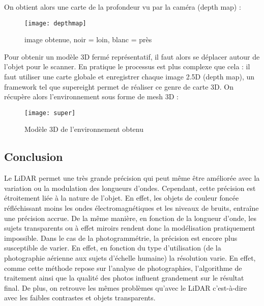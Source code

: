 On obtient alors une carte de la profondeur vu par la caméra (depth map) :

\begin{figure}[h]
    \centering
    \texttt{[image: depthmap]}
    \caption{image obtenue, noir = loin, blanc = près}
    \label{fig:pifuhdWork3}
\end{figure}
\FloatBarrier

Pour obtenir un modèle 3D fermé représentatif, il faut alors se déplacer autour de l'objet pour le scanner. 
\newpage
En pratique le processus est plus complexe que cela : il faut utiliser une carte globale et enregistrer chaque image 2.5D (depth map), un framework tel que supereight \cite{super} permet de réaliser ce genre de carte 3D.
On récupère alors l'environnement sous forme de mesh 3D :

\begin{figure}[h]
    \centering
    \texttt{[image: super]}
    \caption{Modèle 3D de l'environnement obtenu}
    \label{fig:super}
\end{figure}
\FloatBarrier


\subsection{Conclusion}


Le LiDAR permet une très grande précision qui peut même être améliorée avec la variation ou la modulation des longueurs d'ondes. Cependant, cette précision est étroitement liée à la nature de l'objet. En effet, les objets de couleur foncée réfléchissant moins les ondes électromagnétiques et les niveaux de bruits, entraîne une précision accrue. De la même manière, en fonction de la longueur d'onde, les sujets transparents ou à effet miroirs rendent donc la modélisation pratiquement impossible.
Dans le cas de la photogrammétrie, la précision est encore plus susceptible de varier. En effet, en fonction du type d'utilisation (de la photographie aérienne aux sujets d'échelle humaine) la résolution varie. En effet, comme cette méthode repose sur l'analyse de photographies, l'algorithme de traitement ainsi que la qualité des photos influent grandement sur le résultat final. De plus, on retrouve les mêmes problèmes qu'avec le LiDAR c'est-à-dire avec les faibles contrastes et objets transparents.





